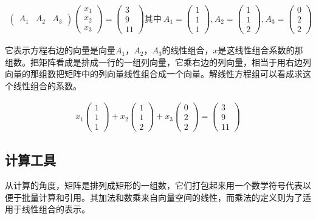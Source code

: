 \begin{gather*}
	\begin{pmatrix}
		A_1&A_2&A_3
	\end{pmatrix}
	\begin{pmatrix}
		x_1\\x_2\\x_3
	\end{pmatrix}=
	\begin{pmatrix}
		3\\9\\11
	\end{pmatrix}
	\mbox{其中} \ 
	A_1 = \begin{pmatrix}
		1\\1\\1
	\end{pmatrix},
	A_2 = \begin{pmatrix}
		1\\1\\2
	\end{pmatrix},
	A_3 = \begin{pmatrix}
		0\\2\\2
	\end{pmatrix}
\end{gather*}

它表示方程右边的向量是向量$ A_1，A_2，A_3 $的线性组合，$ x $是这线性组合系数的那组数。把矩阵看成是排成一行的一组列向量，它乘右边的列向量，相当于用右边列向量的那组数把矩阵中的列向量线性组合成一个向量。解线性方程组可以看成求这个线性组合的系数。

\begin{gather*}
	x_1 \begin{pmatrix}
		1\\1\\1
	\end{pmatrix}+
	x_2 \begin{pmatrix}
		1\\1\\2
	\end{pmatrix}+
	x_3 \begin{pmatrix}
		0\\2\\2
	\end{pmatrix}=
	\begin{pmatrix}
		3\\9\\11
	\end{pmatrix}		
\end{gather*}

\subsection{计算工具}
从计算的角度，矩阵是排列成矩形的一组数，它们打包起来用一个数学符号代表以便于批量计算和引用。其加法和数乘来自向量空间的线性，而乘法的定义则为了适用于线性组合的表示。

